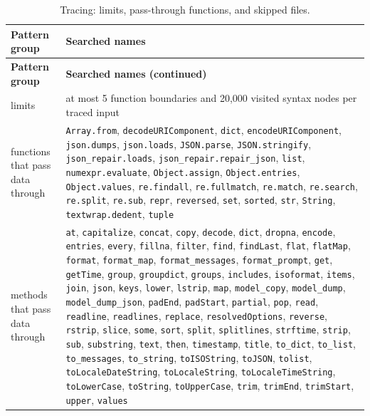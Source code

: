 {\begin{longtable}{@{}>{\raggedright\arraybackslash}p{}>{\raggedright\arraybackslash}p{}@{}}
\caption{Tracing: limits, pass-through functions, and skipped files.}\label{tab:app-tracing}\\
\toprule
\textbf{Pattern group} & \textbf{Searched names} \\
\midrule
\endfirsthead
\toprule
\textbf{Pattern group} & \textbf{Searched names (continued)} \\
\midrule
\endhead
\bottomrule
\endfoot
limits & at most 5 function boundaries and 20{,}000 visited syntax nodes per traced input \\
functions that pass data through & \texttt{Array.from}, \texttt{decodeURIComponent}, \texttt{dict}, \texttt{encodeURIComponent}, \texttt{json.dumps}, \texttt{json.loads}, \texttt{JSON.parse}, \texttt{JSON.stringify}, \texttt{json\_repair.loads}, \texttt{json\_repair.repair\_json}, \texttt{list}, \texttt{numexpr.evaluate}, \texttt{Object.assign}, \texttt{Object.entries}, \texttt{Object.values}, \texttt{re.findall}, \texttt{re.fullmatch}, \texttt{re.match}, \texttt{re.search}, \texttt{re.split}, \texttt{re.sub}, \texttt{repr}, \texttt{reversed}, \texttt{set}, \texttt{sorted}, \texttt{str}, \texttt{String}, \texttt{textwrap.dedent}, \texttt{tuple} \\
methods that pass data through & \texttt{at}, \texttt{capitalize}, \texttt{concat}, \texttt{copy}, \texttt{decode}, \texttt{dict}, \texttt{dropna}, \texttt{encode}, \texttt{entries}, \texttt{every}, \texttt{fillna}, \texttt{filter}, \texttt{find}, \texttt{findLast}, \texttt{flat}, \texttt{flatMap}, \texttt{format}, \texttt{format\_map}, \texttt{format\_messages}, \texttt{format\_prompt}, \texttt{get}, \texttt{getTime}, \texttt{group}, \texttt{groupdict}, \texttt{groups}, \texttt{includes}, \texttt{isoformat}, \texttt{items}, \texttt{join}, \texttt{json}, \texttt{keys}, \texttt{lower}, \texttt{lstrip}, \texttt{map}, \texttt{model\_copy}, \texttt{model\_dump}, \texttt{model\_dump\_json}, \texttt{padEnd}, \texttt{padStart}, \texttt{partial}, \texttt{pop}, \texttt{read}, \texttt{readline}, \texttt{readlines}, \texttt{replace}, \texttt{resolvedOptions}, \texttt{reverse}, \texttt{rstrip}, \texttt{slice}, \texttt{some}, \texttt{sort}, \texttt{split}, \texttt{splitlines}, \texttt{strftime}, \texttt{strip}, \texttt{sub}, \texttt{substring}, \texttt{text}, \texttt{then}, \texttt{timestamp}, \texttt{title}, \texttt{to\_dict}, \texttt{to\_list}, \texttt{to\_messages}, \texttt{to\_string}, \texttt{toISOString}, \texttt{toJSON}, \texttt{tolist}, \texttt{toLocaleDateString}, \texttt{toLocaleString}, \texttt{toLocaleTimeString}, \texttt{toLowerCase}, \texttt{toString}, \texttt{toUpperCase}, \texttt{trim}, \texttt{trimEnd}, \texttt{trimStart}, \texttt{upper}, \texttt{values} \\

\end{longtable}}
